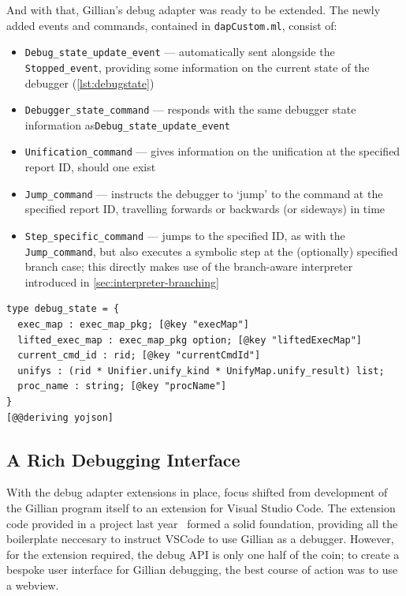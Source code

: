 And with that, Gillian's debug adapter was ready to be extended. The newly added
events and commands, contained in \texttt{dapCustom.ml}, consist of:
\begin{itemize}
  \item \texttt{Debug\_state\_update\_event} --- automatically sent alongside
        the \texttt{Stopped\_event}, providing some information on the current
        state of the debugger (\autoref{lst:debugstate})
  \item \texttt{Debugger\_state\_command} --- responds with the same debugger
        state information as\newline\texttt{Debug\_state\_update\_event}
  \item \texttt{Unification\_command} --- gives information on the unification
        at the specified report ID, should one exist
  \item \texttt{Jump\_command} --- instructs the debugger to `jump' to the
        command at the specified report ID, travelling forwards or backwards
        (or sideways) in time
  \item \texttt{Step\_specific\_command} --- jumps to the specified ID, as with
        the \texttt{Jump\_command}, but also executes a symbolic step at the
        (optionally) specified branch case; this directly makes use of the
        branch-aware interpreter introduced in
        \autoref{sec:interpreter-branching}
\end{itemize}

\begin{lstlisting}[caption={
  The \texttt{debug\_state} type, of \texttt{Debugger.Inspect}
  \label{lst:debugstate}}, style=code, numbers=none]
type debug_state = {
  exec_map : exec_map_pkg; [@key "execMap"]
  lifted_exec_map : exec_map_pkg option; [@key "liftedExecMap"]
  current_cmd_id : rid; [@key "currentCmdId"]
  unifys : (rid * Unifier.unify_kind * UnifyMap.unify_result) list;
  proc_name : string; [@key "procName"]
}
[@@deriving yojson]
\end{lstlisting}


\subsection{A Rich Debugging Interface}

With the debug adapter extensions in place, focus shifted from development of
the Gillian program itself to an extension for Visual Studio Code. The extension
code provided in a project last year~\cite{gillian-debugging-2021} formed a
solid foundation, providing all the boilerplate neccesary to instruct VSCode to
use Gillian as a debugger. However, for the extension required, the debug API
is only one half of the coin; to create a bespoke user interface for Gillian
debugging, the best course of action was to use a webview.

